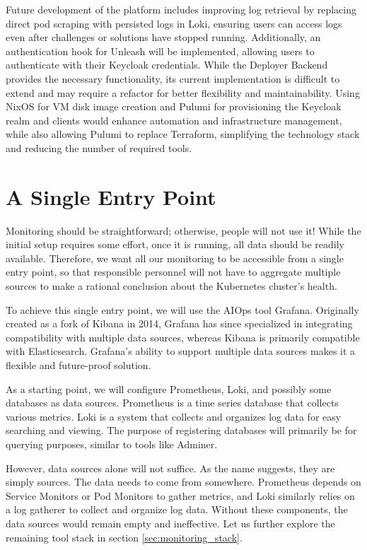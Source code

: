 Future development of the platform includes improving log retrieval by replacing direct pod scraping with persisted logs in Loki, ensuring users can access logs even after challenges or solutions have stopped running. Additionally, an authentication hook for Unleash will be implemented, allowing users to authenticate with their Keycloak credentials. While the Deployer Backend provides the necessary functionality, its current implementation is difficult to extend and may require a refactor for better flexibility and maintainability. Using NixOS for VM disk image creation and Pulumi for provisioning the Keycloak realm and clients would enhance automation and infrastructure management, while also allowing Pulumi to replace Terraform, simplifying the technology stack and reducing the number of required tools.

\cleardoublepage
{}
{}
\printbibliography


\section{A Single Entry Point}
Monitoring should be straightforward; otherwise, people will not use it! While the initial setup requires some effort, once it is running, all data should be readily available. Therefore, we want all our monitoring to be accessible from a single entry point, so that responsible personnel will not have to aggregate multiple sources to make a rational conclusion about the Kubernetes cluster's health.

To achieve this single entry point, we will use the AIOps tool Grafana. Originally created as a fork of Kibana in 2014, Grafana has since specialized in integrating compatibility with multiple data sources, whereas Kibana is primarily compatible with Elasticsearch. Grafana's ability to support multiple data sources makes it a flexible and future-proof solution.

As a starting point, we will configure Prometheus, Loki, and possibly some databases as data sources. Prometheus is a time series database that collects various metrics. Loki is a system that collects and organizes log data for easy searching and viewing. The purpose of registering databases will primarily be for querying purposes, similar to tools like Adminer.

However, data sources alone will not suffice. As the name suggests, they are simply sources. The data needs to come from somewhere. Prometheus depends on Service Monitors or Pod Monitors to gather metrics, and Loki similarly relies on a log gatherer to collect and organize log data. Without these components, the data sources would remain empty and ineffective. Let us further explore the remaining tool stack in section \ref{sec:monitoring_stack}.

